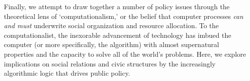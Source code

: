 Finally, we attempt to draw together a number of policy issues through
the theoretical lens of `computationalism,' or the belief that
computer processes \emph{can and must} underwrite social organization
and resource allocation.  To the computationalist, the inexorable
advancement of technology has imbued the computer (or more
specifically, the algorithm) with almost supernatural properties and
the capacity to solve all of the world's problems. Here, we explore
implications on social relations and civic structures by the
increasingly algorithmic logic that drives public policy.
